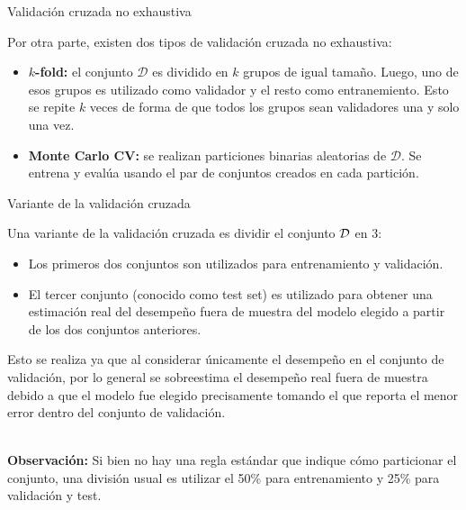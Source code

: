 \documentclass[9pt]{beamer}
\begin{document}
\begin{frame}{Validación cruzada no exhaustiva}
	
Por otra parte, existen dos tipos de validación cruzada no exhaustiva: \pause
	
\begin{itemize}
	\item \textbf{$k$-fold:} el conjunto $\mathcal{D}$ es dividido en $k$ grupos de igual tamaño. Luego, uno de esos grupos es utilizado como validador y el resto como entranemiento. Esto se repite $k$ veces de forma de que todos los grupos sean validadores una y solo una vez.\pause
	\item \textbf{Monte Carlo CV:} se realizan particiones binarias aleatorias de $\mathcal{D}$. Se entrena y evalúa usando el par de conjuntos creados en cada partición.
\end{itemize}

\end{frame}

\begin{frame}{Variante de la validación cruzada}

Una variante de la validación cruzada es dividir el conjunto ${\mathcal D}$ en 3: \pause

\begin{itemize}
	\item Los primeros dos conjuntos son utilizados para entrenamiento y validación. \pause
	\item El tercer conjunto (conocido como test set) es utilizado para obtener una estimación real del desempeño fuera de muestra del modelo elegido a partir de los dos conjuntos anteriores. \pause
\end{itemize}

Esto se realiza ya que al considerar únicamente el desempeño en el conjunto de validación, por lo general se sobreestima el desempeño real fuera de muestra debido a que el modelo fue elegido precisamente tomando el que reporta el menor error dentro del conjunto de validación.\\~\ \pause

\textbf{Observación:} Si bien no hay una regla estándar que indique cómo particionar el conjunto, una división usual es utilizar el 50\% para entrenamiento y 25\% para validación y test.
	
\end{frame}
\end{document}
